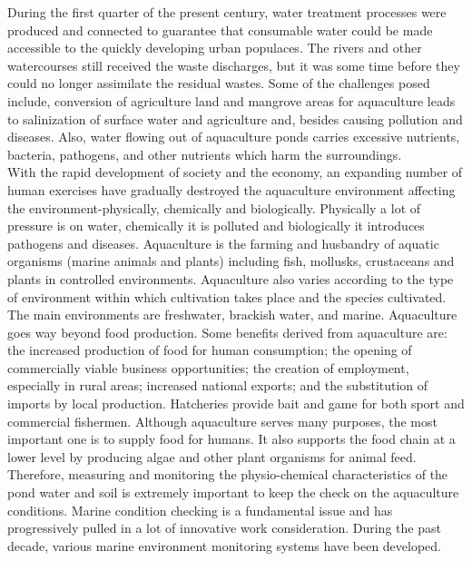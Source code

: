 \documentclass[12pt]{article}
\begin{document}
During the first quarter of the present century, water treatment processes were produced and connected to guarantee that consumable water could be made accessible to the quickly developing urban populaces.  The rivers and other watercourses still received the waste discharges, but it was some time before they could no longer assimilate the residual wastes. Some of the challenges posed include, conversion of agriculture land and mangrove areas for aquaculture leads to salinization of surface water and agriculture and, besides causing pollution and diseases. Also, water flowing out of aquaculture ponds carries excessive nutrients, bacteria, pathogens, and other nutrients which harm the surroundings. \\

With the rapid development of society and the economy, an expanding number of human exercises have gradually destroyed the aquaculture environment affecting the environment-physically, chemically and biologically. Physically a lot of pressure is on water, chemically it is polluted and biologically it introduces pathogens and diseases.  Aquaculture is the farming and husbandry of aquatic organisms (marine animals and plants) including fish, mollusks, crustaceans and plants in controlled environments. Aquaculture also varies according to the type of environment within which cultivation takes place and the species cultivated. The main environments are freshwater, brackish water, and marine. Aquaculture goes way beyond food production.  Some benefits derived from aquaculture are: the increased production of food for human consumption; the opening of commercially viable business opportunities; the creation of employment, especially in rural areas; increased national exports; and the substitution of imports by local production. Hatcheries provide bait and game for both sport and commercial fishermen. Although aquaculture serves many purposes, the most important one is to supply food for humans. It also supports the food chain at a lower level by producing algae and other plant organisms for animal feed.
Therefore, measuring and monitoring the physio-chemical characteristics of the pond water and soil is extremely important to keep the check on the aquaculture conditions. Marine condition checking is a fundamental issue and has progressively pulled in a lot of innovative work consideration. During the past decade, various marine environment monitoring systems have been developed. \\
\end{document}
